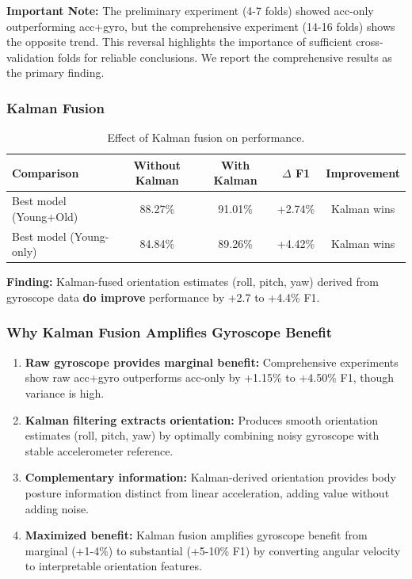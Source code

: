 \documentclass{article}
\begin{document}
\textbf{Important Note:} The preliminary experiment (4-7 folds) showed acc-only outperforming acc+gyro, but the comprehensive experiment (14-16 folds) shows the opposite trend. This reversal highlights the importance of sufficient cross-validation folds for reliable conclusions. We report the comprehensive results as the primary finding.

\subsubsection{Kalman Fusion}

\begin{table}[htbp]
    \centering
    \caption{Effect of Kalman fusion on performance.}
    \label{tab:rq2_kalman}
    \begin{tabular}{lcccc}
        \toprule
        \textbf{Comparison} & \textbf{Without Kalman} & \textbf{With Kalman} & \textbf{$\Delta$ F1} & \textbf{Improvement} \\
        \midrule
        Best model (Young+Old) & 88.27\% & 91.01\% & +2.74\% & Kalman wins \\
        Best model (Young-only) & 84.84\% & 89.26\% & +4.42\% & Kalman wins \\
        \bottomrule
    \end{tabular}
\end{table}

\textbf{Finding:} Kalman-fused orientation estimates (roll, pitch, yaw) derived from gyroscope data \textbf{do improve} performance by +2.7 to +4.4\% F1.

\subsubsection{Why Kalman Fusion Amplifies Gyroscope Benefit}

\begin{enumerate}
    \item \textbf{Raw gyroscope provides marginal benefit:} Comprehensive experiments show raw acc+gyro outperforms acc-only by +1.15\% to +4.50\% F1, though variance is high.
    \item \textbf{Kalman filtering extracts orientation:} Produces smooth orientation estimates (roll, pitch, yaw) by optimally combining noisy gyroscope with stable accelerometer reference.
    \item \textbf{Complementary information:} Kalman-derived orientation provides body posture information distinct from linear acceleration, adding value without adding noise.
    \item \textbf{Maximized benefit:} Kalman fusion amplifies gyroscope benefit from marginal (+1-4\%) to substantial (+5-10\% F1) by converting angular velocity to interpretable orientation features.
\end{enumerate}
\end{document}
